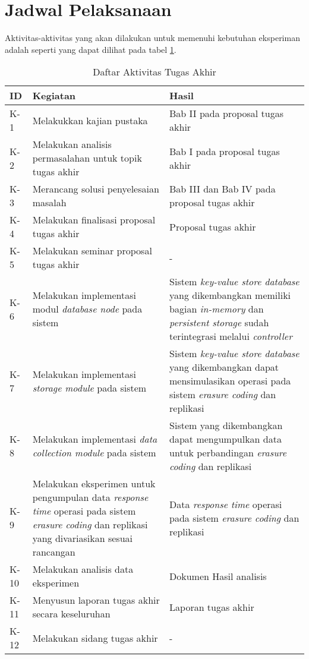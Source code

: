 \section{Jadwal Pelaksanaan}
\label{sec:jadwal-pelaksanaan}
Aktivitas-aktivitas yang akan dilakukan untuk memenuhi kebutuhan eksperiman adalah seperti yang dapat dilihat pada tabel \ref{tab:rincian-aktivitas}.

\begin{longtable}{|p{1cm}|p{6cm}|p{6cm}|}
\caption{Daftar Aktivitas Tugas Akhir} 
\label{tab:rincian-aktivitas} \\
\hline
\rowcolor{black!10} ID & Kegiatan & Hasil \\ \hline
K-1  & Melakukkan kajian pustaka & Bab II pada proposal tugas akhir \\ \hline
K-2  & Melakukan analisis permasalahan untuk topik tugas akhir & Bab I pada proposal tugas akhir \\ \hline
K-3  & Merancang solusi penyelesaian masalah & Bab III dan Bab IV pada proposal tugas akhir \\ \hline
K-4  & Melakukan finalisasi proposal tugas akhir & Proposal tugas akhir \\ \hline
K-5  & Melakukan seminar proposal tugas akhir & - \\ \hline
K-6  & Melakukan implementasi modul \textit{database node} pada sistem & Sistem \textit{key-value store database} yang dikembangkan memiliki bagian \textit{in-memory} dan \textit{persistent storage} sudah terintegrasi melalui \textit{controller} \\ \hline
K-7  & Melakukan implementasi \textit{storage module} pada sistem & Sistem \textit{key-value store database} yang dikembangkan dapat mensimulasikan operasi pada sistem \textit{erasure coding} dan replikasi \\ \hline
K-8  & Melakukan implementasi \textit{data collection module} pada sistem & Sistem yang dikembangkan dapat mengumpulkan data untuk perbandingan \textit{erasure coding} dan replikasi \\ \hline
K-9  & Melakukan eksperimen untuk pengumpulan data \textit{response time} operasi pada sistem \textit{erasure coding} dan replikasi yang divariasikan sesuai rancangan & Data \textit{response time} operasi pada sistem \textit{erasure coding} dan replikasi \\ \hline
K-10  & Melakukan analisis data eksperimen & Dokumen Hasil analisis \\ \hline
K-11  & Menyusun laporan tugas akhir secara keseluruhan & Laporan tugas akhir \\ \hline
K-12  & Melakukan sidang tugas akhir & - \\ \hline 
\end{longtable}

